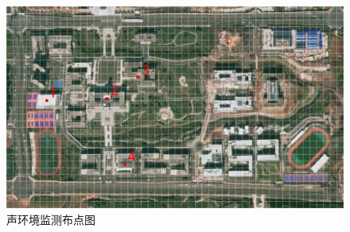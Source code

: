 \begin{figure}[H]
    \centering
    \includegraphics[width=\textwidth]{figures/Acoustic environment monitoring dot map.png}
    \caption{声环境监测布点图}
    \label{fig:Acoustic environment monitoring dot map}
\end{figure}

